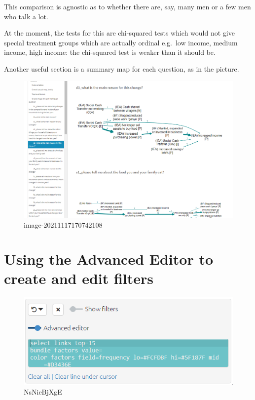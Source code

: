 \documentclass[
]{book}
\begin{document}
This comparison is agnostic as to whether there are, say, many men or a few men who talk a lot.

At the moment, the tests for this are chi-squared tests which would not give special treatment groups which are actually ordinal e.g.~low income, medium income, high income: the chi-squared test is weaker than it should be.

Another useful section is a summary map for each question, as in the picture.

\begin{figure}
\centering
\includegraphics{_assets/image-20211117170742108.png}
\caption{image-20211117170742108}
\end{figure}

\hypertarget{advanced-editor}{%
\chapter{Using the Advanced Editor to create and edit filters}\label{advanced-editor}}

\begin{figure}
\centering
\includegraphics[width=6.77083in,height=\textheight]{_assets/NsNieBjXgE.gif}
\caption{NsNieBjXgE}
\end{figure}
\end{document}
